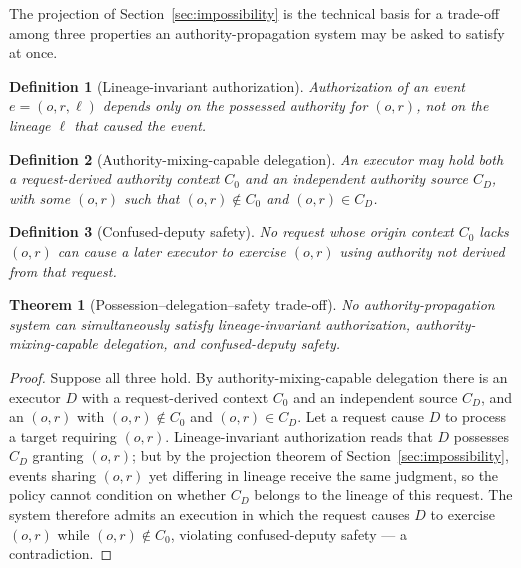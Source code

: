 \documentclass[11pt]{article}
\newtheorem{definition}{Definition}
\newtheorem{theorem}{Theorem}
\begin{document}
The projection of Section~\ref{sec:impossibility} is the technical basis for a
trade-off among three properties an authority-propagation system may be asked to
satisfy at once.

\begin{definition}[Lineage-invariant authorization]
Authorization of an event $e = (o,r,\ell)$ depends only on the possessed
authority for $(o,r)$, not on the lineage $\ell$ that caused the event.
\end{definition}

\begin{definition}[Authority-mixing-capable delegation]
An executor may hold both a request-derived authority context $C_0$ and an
independent authority source $C_D$, with some $(o,r)$ such that
$(o,r) \notin C_0$ and $(o,r) \in C_D$.
\end{definition}

\begin{definition}[Confused-deputy safety]
No request whose origin context $C_0$ lacks $(o,r)$ can cause a later executor to
exercise $(o,r)$ using authority not derived from that request.
\end{definition}

\begin{theorem}[Possession--delegation--safety trade-off]
No authority-propagation system can simultaneously satisfy lineage-invariant
authorization, authority-mixing-capable delegation, and confused-deputy safety.
\end{theorem}

\begin{proof}
Suppose all three hold. By authority-mixing-capable delegation there is an
executor $D$ with a request-derived context $C_0$ and an independent source
$C_D$, and an $(o,r)$ with $(o,r) \notin C_0$ and $(o,r) \in C_D$. Let a request
cause $D$ to process a target requiring $(o,r)$. Lineage-invariant authorization
reads that $D$ possesses $C_D$ granting $(o,r)$; but by the projection theorem of
Section~\ref{sec:impossibility}, events sharing $(o,r)$ yet differing in lineage
receive the same judgment, so the policy cannot condition on whether $C_D$
belongs to the lineage of this request. The system therefore admits an execution
in which the request causes $D$ to exercise $(o,r)$ while $(o,r) \notin C_0$,
violating confused-deputy safety --- a contradiction.
\end{proof}
\end{document}
